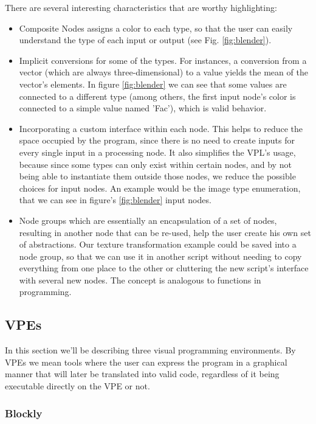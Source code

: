 There are several interesting characteristics that are worthy highlighting:
\begin{itemize}
  \item Composite Nodes assigns a color to each type, so that the user can
easily understand the type of each input or output (see Fig. \ref{fig:blender}).
  \item Implicit conversions for some of the types. For instances,
a conversion from a vector (which are always three-dimensional) to a value yields
the mean of the vector's elements. In figure \ref{fig:blender} we can see that
some values are connected to a different type (among others, the first input
node's color is connected to a simple value named 'Fac'), which is valid behavior.
  \item Incorporating a custom interface within each node. This helps to reduce
the space occupied by the program, since there is no need to create inputs for
every single input in a processing node. It also simplifies the VPL's usage,
because since some types can only exist within certain nodes, and by not being
able to instantiate them outside those nodes, we reduce the possible choices
for input nodes. An example would be the image type enumeration, that we can
see in figure's \ref{fig:blender} input nodes.
  \item Node groups which are essentially an encapsulation
of a set of nodes, resulting in another node that can be re-used, help the user
create his own set of abstractions. Our texture transformation example could
be saved into a node group, so that we can use it in another script without
needing to copy everything from one place to the other or cluttering the new
script's interface with several new nodes. The concept is analogous to functions
in programming.
\end{itemize}

\subsection{VPEs}

In this section we'll be describing three visual programming environments. By VPEs
we mean tools where the user can express the program in a graphical manner that will
later be translated into valid code, regardless of it being executable directly
on the VPE or not.

\subsubsection{Blockly}


